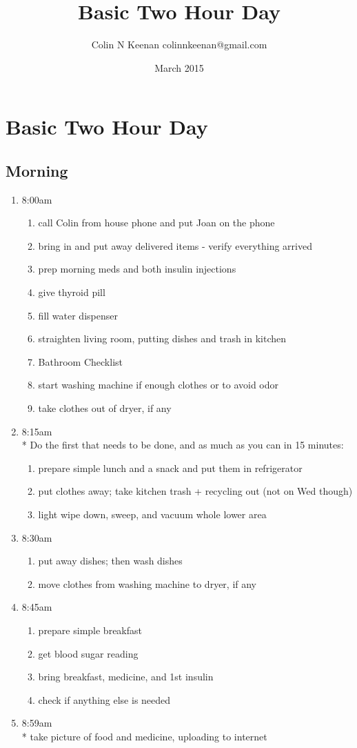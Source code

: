 \documentclass[12pt,letterpaper]{article}
\newcommand{\mytitle}{Basic Two Hour Day}
\begin{document}
\title{\mytitle{}}
\author{Colin N Keenan colinnkeenan@gmail.com}
\date{March 2015}
\section*{\mytitle{}}
\begin{multicols}{2} 
\subsection*{Morning}
\begin{enumerate}
	\item 8:00am
		\begin{enumerate}
			\item call Colin from house phone and put Joan on the phone
			\item bring in and put away delivered items - verify everything arrived
			\item prep morning meds and both insulin injections
			\item give thyroid pill
			\item fill water dispenser
			\item straighten living room, putting dishes and trash in kitchen
			\item Bathroom Checklist
			\item start washing machine if enough clothes or to avoid odor
			\item take clothes out of dryer, if any
		\end{enumerate}
	\item 8:15am \\*
		Do the first that needs to be done, and as much as you can in 15 minutes:
		\begin{enumerate}
			\item prepare simple lunch and a snack and put them in refrigerator
			\item put clothes away; take kitchen trash + recycling out (not on Wed though)
			\item light wipe down, sweep, and vacuum whole lower area
		\end{enumerate}
	\item 8:30am
		\begin{enumerate}
			\item put away dishes; then wash dishes
			\item move clothes from washing machine to dryer, if any
		\end{enumerate}
	\item 8:45am
		\begin{enumerate}
			\item prepare simple breakfast
			\item get blood sugar reading
			\item bring breakfast, medicine, and 1st insulin
			\item check if anything else is needed
		\end{enumerate}
	\item 8:59am \\*
		take picture of food and medicine, uploading to internet
\end{enumerate}
\vfill
\columnbreak


\end{multicols}
\end{document}
